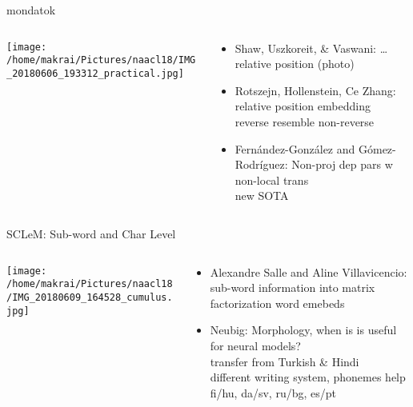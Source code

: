 \documentclass{beamer}
\begin{document}
\begin{frame}{mondatok}
\begin{columns}\begin{column}{.35\textwidth}\centering \texttt{[image: /home/makrai/Pictures/naacl18/IMG\_20180606\_193312\_practical.jpg]}\end{column}\begin{column}{.65\textwidth}
    \begin{itemize}
      \item Shaw, Uszkoreit, \& Vaswani: \dots \alert{relative position} (photo)
      \item Rotszejn, Hollenstein, Ce Zhang: relative position embedding
        \\ reverse resemble non-reverse
      \item Fernández-González and Gómez-Rodríguez: Non-proj dep pars w non-local trans 
        \\ new SOTA
    \end{itemize}
\end{column} \end{columns}
\end{frame}

%

\begin{frame}{SCLeM: Sub-word and Char Level}
\begin{columns}\begin{column}{.35\textwidth}\centering \texttt{[image: /home/makrai/Pictures/naacl18/IMG\_20180609\_164528\_cumulus.jpg]}\end{column}\begin{column}{.65\textwidth}
  \begin{itemize} 
    \item %
      Alexandre Salle and Aline Villavicencio: 
      sub-word information into matrix factorization word emebeds
    \item Neubig: Morphology, when is is useful for neural models?
      \\ transfer from Turkish \& Hindi
      \\ different writing system, phonemes help
      \\ fi/hu, da/sv, ru/bg, es/pt
  \end{itemize}
\end{column} \end{columns}
\end{frame} 
\end{document}
